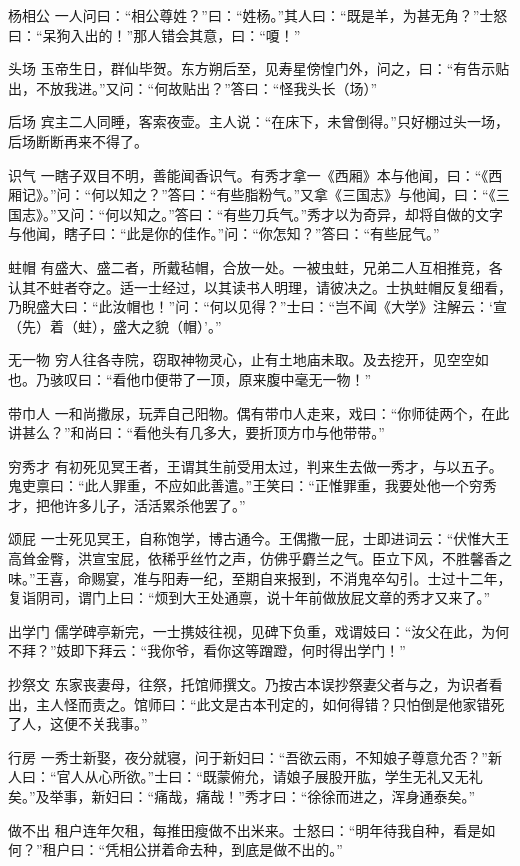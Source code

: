 \documentclass[12pt,UTF8]{ctexbook}
\begin{document}
杨相公
一人问曰：“相公尊姓？”曰：“姓杨。”其人曰：“既是羊，为甚无角？”士怒曰：“呆狗入出的！”那人错会其意，曰：“嗄！”

头场
玉帝生日，群仙毕贺。东方朔后至，见寿星傍惶门外，问之，曰：“有告示贴出，不放我进。”又问：“何故贴出？”答曰：“怪我头长（场）”

后场
宾主二人同睡，客索夜壶。主人说：“在床下，未曾倒得。”只好棚过头一场，后场断断再来不得了。

识气
一瞎子双目不明，善能闻香识气。有秀才拿一《西厢》本与他闻，曰：“《西厢记》。”问：“何以知之？”答曰：“有些脂粉气。”又拿《三国志》与他闻，曰：“《三国志》。”又问：“何以知之。”答曰：“有些刀兵气。”秀才以为奇异，却将自做的文字与他闻，瞎子曰：“此是你的佳作。”问：“你怎知？”答曰：“有些屁气。”

蛀帽
有盛大、盛二者，所戴毡帽，合放一处。一被虫蛀，兄弟二人互相推竞，各认其不蛀者夺之。适一士经过，以其读书人明理，请彼决之。士执蛀帽反复细看，乃睨盛大曰：“此汝帽也！”问：“何以见得？”士曰：“岂不闻《大学》注解云：‘宣（先）着（蛀），盛大之貌（帽）’。”

无一物
穷人往各寺院，窃取神物灵心，止有土地庙未取。及去挖开，见空空如也。乃骇叹曰：“看他巾便带了一顶，原来腹中毫无一物！”

带巾人
一和尚撒尿，玩弄自己阳物。偶有带巾人走来，戏曰：“你师徒两个，在此讲甚么？”和尚曰：“看他头有几多大，要折顶方巾与他带带。”

穷秀才
有初死见冥王者，王谓其生前受用太过，判来生去做一秀才，与以五子。鬼吏禀曰：“此人罪重，不应如此善遣。”王笑曰：“正惟罪重，我要处他一个穷秀才，把他许多儿子，活活累杀他罢了。”

颂屁
一士死见冥王，自称饱学，博古通今。王偶撒一屁，士即进词云：“伏惟大王高耸金臀，洪宣宝屁，依稀乎丝竹之声，仿佛乎麝兰之气。臣立下风，不胜馨香之味。”王喜，命赐宴，准与阳寿一纪，至期自来报到，不消鬼卒勾引。士过十二年，复诣阴司，谓门上曰：“烦到大王处通禀，说十年前做放屁文章的秀才又来了。”

出学门
儒学碑亭新完，一士携妓往视，见碑下负重，戏谓妓曰：“汝父在此，为何不拜？”妓即下拜云：“我你爷，看你这等蹭蹬，何时得出学门！”

抄祭文
东家丧妻母，往祭，托馆师撰文。乃按古本误抄祭妻父者与之，为识者看出，主人怪而责之。馆师曰：“此文是古本刊定的，如何得错？只怕倒是他家错死了人，这便不关我事。”

行房
一秀士新娶，夜分就寝，问于新妇曰：“吾欲云雨，不知娘子尊意允否？”新人曰：“官人从心所欲。”士曰：“既蒙俯允，请娘子展股开肱，学生无礼又无礼矣。”及举事，新妇曰：“痛哉，痛哉！”秀才曰：“徐徐而进之，浑身通泰矣。”

做不出
租户连年欠租，每推田瘦做不出米来。士怒曰：“明年待我自种，看是如何？”租户曰：“凭相公拼着命去种，到底是做不出的。”
\end{document}
